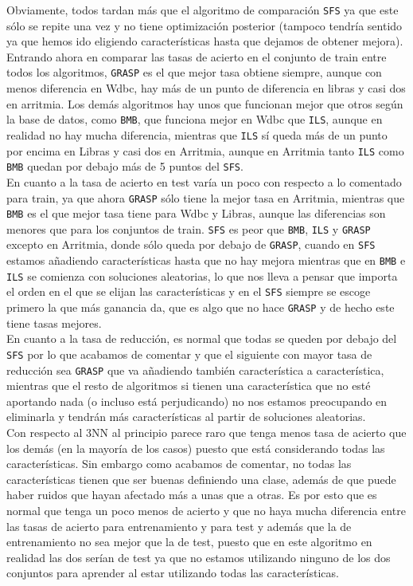 \documentclass[12pt]{article}
\begin{document}
Obviamente, todos tardan más que el algoritmo de comparación \texttt{SFS} ya que este sólo se repite una vez y no tiene optimización posterior (tampoco tendría sentido ya que hemos ido eligiendo características hasta que dejamos de obtener mejora).\\

Entrando ahora en comparar las tasas de acierto en el conjunto de train entre todos los algoritmos, \texttt{GRASP} es el que mejor tasa obtiene siempre, aunque con menos diferencia en Wdbc, hay más de un punto de diferencia en libras y casi dos en arritmia. Los demás algoritmos hay unos que funcionan mejor que otros según la base de datos, como \texttt{BMB}, que funciona mejor en Wdbc que \texttt{ILS}, aunque en realidad no hay mucha diferencia, mientras que \texttt{ILS} sí queda más de un punto por encima en Libras y casi dos en Arritmia, aunque en Arritmia tanto \texttt{ILS} como \texttt{BMB} quedan por debajo más de 5 puntos del \texttt{SFS}.\\

En cuanto a la tasa de acierto en test varía un poco con respecto a lo comentado para train, ya que ahora \texttt{GRASP} sólo tiene la mejor tasa en Arritmia, mientras que \texttt{BMB} es el que mejor tasa tiene para Wdbc y Libras, aunque las diferencias son menores que para los conjuntos de train. \texttt{SFS} es peor que \texttt{BMB}, \texttt{ILS} y \texttt{GRASP} excepto en Arritmia, donde sólo queda por debajo de \texttt{GRASP}, cuando en \texttt{SFS} estamos añadiendo características hasta que no hay mejora mientras que en \texttt{BMB} e \texttt{ILS} se comienza con soluciones aleatorias, lo que nos lleva a pensar que importa el orden en el que se elijan las características y en el \texttt{SFS} siempre se escoge primero la que más ganancia da, que es algo que no hace \texttt{GRASP} y de hecho este tiene tasas mejores.\\

En cuanto a la tasa de reducción, es normal que todas se queden por debajo del \texttt{SFS} por lo que acabamos de comentar y que el siguiente con mayor tasa de reducción sea \texttt{GRASP} que va añadiendo también característica a característica, mientras que el resto de algoritmos si tienen una característica que no esté aportando nada (o incluso está perjudicando) no nos estamos preocupando en eliminarla y tendrán más características al partir de soluciones aleatorias.\\

Con respecto al 3NN al principio parece raro que tenga menos tasa de acierto que los demás (en la mayoría de los casos) puesto que está considerando todas las características. Sin embargo como acabamos de comentar, no todas las características tienen que ser buenas definiendo una clase, además de que puede haber ruidos que hayan afectado más a unas que a otras. Es por esto que es normal que tenga un poco menos de acierto y que no haya mucha diferencia entre las tasas de acierto para entrenamiento y para test y además que la de entrenamiento no sea mejor que la de test, puesto que en este algoritmo en realidad las dos serían de test ya que no estamos utilizando ninguno de los dos conjuntos para aprender al estar utilizando todas las características.\\
\end{document}
